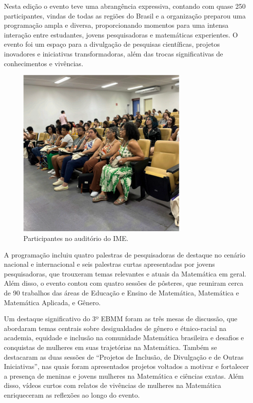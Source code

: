 \documentclass{hipatia}
\begin{document}
Nesta edição o evento teve uma abrangência expressiva, contando com quase 250 participantes, vindas de todas as regiões do Brasil e a organização preparou uma programação ampla e diversa, proporcionando momentos para uma intensa interação entre estudantes, jovens pesquisadoras e matemáticas experientes. O evento foi um espaço para a divulgação de pesquisas científicas, projetos inovadores e iniciativas transformadoras, além das trocas significativas de conhecimentos e vivências.

\begin{figure}[htb]
    \centering
    \includegraphics[width=8.5cm]{EBMM4.png}
    \caption{Participantes no auditório do IME.}
 \label{EBMM4}
\end{figure}

A programação incluiu quatro palestras de pesquisadoras de destaque no cenário nacional e internacional e seis palestras curtas apresentadas por jovens pesquisadoras, que trouxeram temas relevantes e atuais da Matemática em geral. Além disso, o evento contou com quatro sessões de pôsteres, que reuniram cerca de 90 trabalhos das áreas de Educação e Ensino de Matemática, Matemática e Matemática Aplicada, e Gênero.

Um destaque significativo do 3º EBMM foram as três mesas de discussão, que abordaram temas centrais sobre desigualdades de gênero e étnico-racial na academia, equidade e inclusão na comunidade Matemática brasileira e desafios e conquistas de mulheres em suas trajetórias na Matemática. Também se destacaram as duas sessões de ``Projetos de Inclusão, de Divulgação e de Outras Iniciativas'', nas quais foram apresentados projetos voltados a motivar e fortalecer a presença de meninas e jovens mulheres na Matemática e ciências exatas. Além disso, vídeos curtos com relatos de vivências de mulheres na Matemática enriqueceram as reflexões ao longo do evento.
\end{document}

